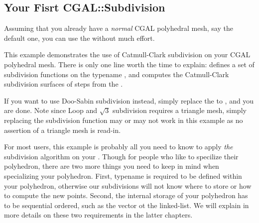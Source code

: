 


\subsection{Your Fisrt CGAL::Subdivision}
Assuming that you already have a \emph{normal} CGAL polyhedral mesh,
say the default one, you can use the 
without much effort.


This example demonstrates the use of Catmull-Clark subdivision
on your CGAL polyhedral mesh. There is only one line worth the time to explain:
 defines a set of subdivision functions
on the typename , and  
computes the Catmull-Clark subdivision surfaces of  steps from the 
.

If you want to use Doo-Sabin subdivision instead, simply replace the 
 to , 
and you are done. Note since Loop and $\sqrt{3}$ subdivision requires 
a triangle mesh, simply replacing the subdivision function may or 
may not work in this example as no assertion of a triangle mesh is 
read-in.

For most users, this example is probably all you need to know to
apply \emph{the} subdivision algorithm on your .
Though for people who like to specilize their polyhedron,
there are two more things you need to keep in mind when specializing 
your polyhedron. First, typename  is 
required to be defined within your polyhedron, otherwise our
subdivisions will not know where to store or how to compute the
new points. Second, the internal storage of your polyhedron has to be
sequential ordered, such as the vector ot the linked-list. We will 
explain in more details on these two requirements in the latter chapters.

